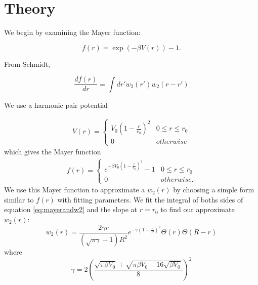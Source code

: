 \documentclass[letterpaper,twocolumn,amsmath,amssymb,prb]{revtex4-1}
\begin{document}
\section{Theory}

We begin by examining the Mayer function:

\begin{equation}
f(r) = \exp (-\beta V(r)) - 1.
\end{equation}

From Schmidt\cite{schmidt2000fluid},

\begin{equation}\label{eq:mayerandw2}
\frac{d f(r)}{dr} = \int dr' w_2(r') w_2 (r-r')
\end{equation}


We use a harmonic pair potential

\begin{align}
  V(r) =
  \begin{cases}
    V_0 \left ( 1 - \frac{r}{r_0} \right )^2 & 0 \leq r \leq r_0\\
    0 & otherwise
  \end{cases}
\end{align}
which gives the Mayer function 
\begin{align}\label{eq:harmonicmayer}
  f(r) =
  \begin{cases}
    e^{-\beta V_0 \left( 1 - \frac{r}{r_0} \right)^2} - 1 & 0 \leq r
    \leq r_0 \\
    0 & otherwise.
  \end{cases} 
\end{align}
We use this Mayer function to approximate a $w_2(r)$ by choosing a
simple form similar to $f(r)$ with fitting parameters. We fit the
integral of boths sides of equation \ref{eq:mayerandw2} and the
slope at $r=r_0$ to find our approximate $w_2(r)$: 
\begin{equation}
  w_2(r) = \frac{2\gamma r}{(\sqrt{\pi \gamma} - 1)R^2} e^{-\gamma
    \left ( 1 - \frac{r}{R} \right )^2}\Theta(r) \Theta (R - r)
\end{equation}
where
\begin{equation}
  \gamma = 2 \left(\frac{\sqrt{\pi \beta V_0} + \sqrt{\pi \beta V_0 -
    16\sqrt{\beta V_0}}}{8}\right)^2
\end{equation}
\end{document}
